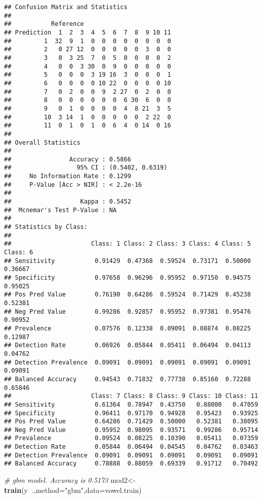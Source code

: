 \documentclass[]{article}
\newenvironment{Shaded}{\begin{snugshade}}{\end{snugshade}}
\newcommand{\KeywordTok}[1]{\textcolor[rgb]{0.13,0.29,0.53}{\textbf{#1}}}
\newcommand{\DataTypeTok}[1]{\textcolor[rgb]{0.13,0.29,0.53}{#1}}
\newcommand{\StringTok}[1]{\textcolor[rgb]{0.31,0.60,0.02}{#1}}
\newcommand{\CommentTok}[1]{\textcolor[rgb]{0.56,0.35,0.01}{\textit{#1}}}
\newcommand{\OperatorTok}[1]{\textcolor[rgb]{0.81,0.36,0.00}{\textbf{#1}}}
\newcommand{\NormalTok}[1]{#1}
\begin{document}
\begin{verbatim}
## Confusion Matrix and Statistics
## 
##           Reference
## Prediction  1  2  3  4  5  6  7  8  9 10 11
##         1  32  9  1  0  0  0  0  0  0  0  0
##         2   0 27 12  0  0  0  0  0  3  0  0
##         3   0  3 25  7  0  5  0  0  0  0  2
##         4   0  0  3 30  0  9  0  0  0  0  0
##         5   0  0  0  3 19 16  3  0  0  0  1
##         6   0  0  0  0 10 22  0  0  0  0 10
##         7   0  2  0  0  9  2 27  0  2  0  0
##         8   0  0  0  0  0  0  6 30  6  0  0
##         9   0  1  0  0  0  0  4  8 21  3  5
##         10  3 14  1  0  0  0  0  0  2 22  0
##         11  0  1  0  1  0  6  4  0 14  0 16
## 
## Overall Statistics
##                                           
##                Accuracy : 0.5866          
##                  95% CI : (0.5402, 0.6319)
##     No Information Rate : 0.1299          
##     P-Value [Acc > NIR] : < 2.2e-16       
##                                           
##                   Kappa : 0.5452          
##  Mcnemar's Test P-Value : NA              
## 
## Statistics by Class:
## 
##                      Class: 1 Class: 2 Class: 3 Class: 4 Class: 5 Class: 6
## Sensitivity           0.91429  0.47368  0.59524  0.73171  0.50000  0.36667
## Specificity           0.97658  0.96296  0.95952  0.97150  0.94575  0.95025
## Pos Pred Value        0.76190  0.64286  0.59524  0.71429  0.45238  0.52381
## Neg Pred Value        0.99286  0.92857  0.95952  0.97381  0.95476  0.90952
## Prevalence            0.07576  0.12338  0.09091  0.08874  0.08225  0.12987
## Detection Rate        0.06926  0.05844  0.05411  0.06494  0.04113  0.04762
## Detection Prevalence  0.09091  0.09091  0.09091  0.09091  0.09091  0.09091
## Balanced Accuracy     0.94543  0.71832  0.77738  0.85160  0.72288  0.65846
##                      Class: 7 Class: 8 Class: 9 Class: 10 Class: 11
## Sensitivity           0.61364  0.78947  0.43750   0.88000   0.47059
## Specificity           0.96411  0.97170  0.94928   0.95423   0.93925
## Pos Pred Value        0.64286  0.71429  0.50000   0.52381   0.38095
## Neg Pred Value        0.95952  0.98095  0.93571   0.99286   0.95714
## Prevalence            0.09524  0.08225  0.10390   0.05411   0.07359
## Detection Rate        0.05844  0.06494  0.04545   0.04762   0.03463
## Detection Prevalence  0.09091  0.09091  0.09091   0.09091   0.09091
## Balanced Accuracy     0.78888  0.88059  0.69339   0.91712   0.70492
\end{verbatim}

\begin{Shaded}
\begin{Highlighting}[]
\CommentTok{# gbm model. Accuracy is 0.5173}
\NormalTok{mod2<-}\KeywordTok{train}\NormalTok{(y}\OperatorTok{~}\NormalTok{.,}\DataTypeTok{method=}\StringTok{"gbm"}\NormalTok{,}\DataTypeTok{data=}\NormalTok{vowel.train)}
\end{Highlighting}
\end{Shaded}
\end{document}
